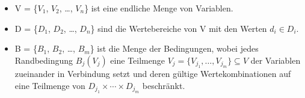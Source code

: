 %
%
\begin{def1} \label{Def:CSP}
\begin{itemize}
\item V = \{$V_1$, $V_2$, \ldots , $V_n$\} ist eine endliche Menge von Variablen.
\item D = \{$D_1$, $D_2$, \ldots , $D_n$\} sind die Wertebereiche von V mit den Werten $d_i \in D_i$.
\item B = \{$B_1$, $B_2$, \ldots , $B_m$\} ist die Menge der Bedingungen, wobei jedes Randbedingung $B_j(V_j)$ eine Teilmenge $V_j = \{V_{j_1},\ldots,V_{j_m}\} \subseteq V$ der Variablen zueinander in Verbindung setzt und deren gültige Wertekombinationen auf eine Teilmenge von $D_{j_1} \times \cdots \times D_{j_m}$ beschränkt.
\end{itemize}
\end{def1}
%

